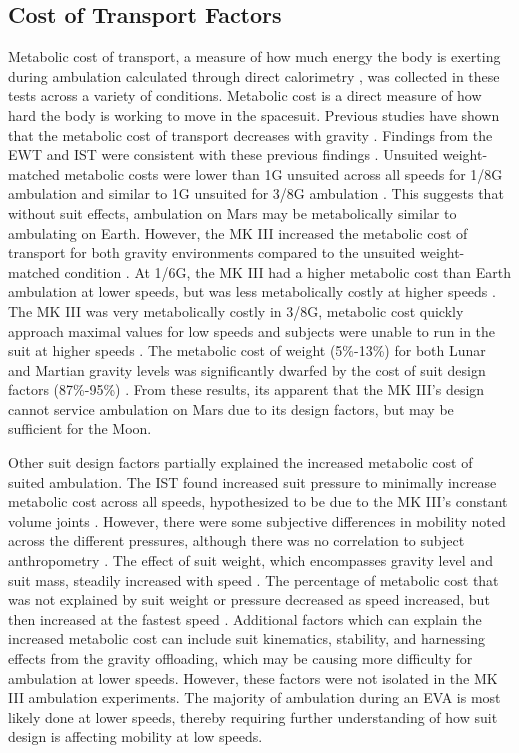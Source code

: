 \documentclass[defaultstyle,11pt]{comps}
\begin{document}
\hypertarget{cost-of-transport-factors}{%
\subsection{Cost of Transport Factors}\label{cost-of-transport-factors}}

Metabolic cost of transport, a measure of how much energy the body is exerting during ambulation calculated through direct calorimetry \citep{Kenny2017}, was collected in these tests across a variety of conditions.
Metabolic cost is a direct measure of how hard the body is working to move in the spacesuit.
Previous studies have shown that the metabolic cost of transport decreases with gravity \citep{Grabowski2005}.
Findings from the EWT and IST were consistent with these previous findings \citep{Norcross2009, Norcross2010}.
Unsuited weight-matched metabolic costs were lower than 1G unsuited across all speeds for 1/8G ambulation and similar to 1G unsuited for 3/8G ambulation \citep{Norcross2009}.
This suggests that without suit effects, ambulation on Mars may be metabolically similar to ambulating on Earth.
However, the MK III increased the metabolic cost of transport for both gravity environments compared to the unsuited weight-matched condition \citep{Norcross2009}.
At 1/6G, the MK III had a higher metabolic cost than Earth ambulation at lower speeds, but was less metabolically costly at higher speeds \citep{Norcross2009, Norcross2010}.
The MK III was very metabolically costly in 3/8G, metabolic cost quickly approach maximal values for low speeds and subjects were unable to run in the suit at higher speeds \citep{Norcross2009}.
The metabolic cost of weight (5\%-13\%) for both Lunar and Martian gravity levels was significantly dwarfed by the cost of suit design factors (87\%-95\%) \citep{Norcross2009}.
From these results, its apparent that the MK III's design cannot service ambulation on Mars due to its design factors, but may be sufficient for the Moon.

Other suit design factors partially explained the increased metabolic cost of suited ambulation.
The IST found increased suit pressure to minimally increase metabolic cost across all speeds, hypothesized to be due to the MK III's constant volume joints \citep{Norcross2010}.
However, there were some subjective differences in mobility noted across the different pressures, although there was no correlation to subject anthropometry \citep{Norcross2010}.
The effect of suit weight, which encompasses gravity level and suit mass, steadily increased with speed \citep{Norcross2010}.
The percentage of metabolic cost that was not explained by suit weight or pressure decreased as speed increased, but then increased at the fastest speed \citep{Norcross2010}.
Additional factors which can explain the increased metabolic cost can include suit kinematics, stability, and harnessing effects from the gravity offloading, which may be causing more difficulty for ambulation at lower speeds.
However, these factors were not isolated in the MK III ambulation experiments.
The majority of ambulation during an EVA is most likely done at lower speeds, thereby requiring further understanding of how suit design is affecting mobility at low speeds.
\end{document}
